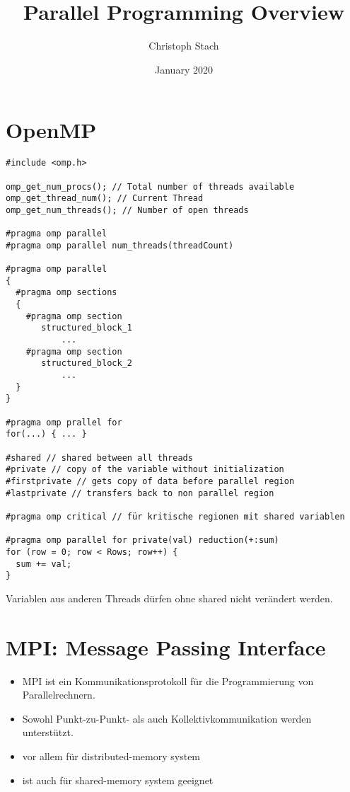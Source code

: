 \documentclass{article}
\title{Parallel Programming Overview}
\author{Christoph Stach}
\date{January 2020}
\begin{document}
\section{OpenMP}

\begin{listing}[H]
\begin{verbatim}
#include <omp.h>

omp_get_num_procs(); // Total number of threads available
omp_get_thread_num(); // Current Thread
omp_get_num_threads(); // Number of open threads

#pragma omp parallel
#pragma omp parallel num_threads(threadCount)

#pragma omp parallel
{
  #pragma omp sections
  {
    #pragma omp section
       structured_block_1
           ...
    #pragma omp section
       structured_block_2
           ...
  }
}

#pragma omp prallel for
for(...) { ... }

#shared // shared between all threads
#private // copy of the variable without initialization
#firstprivate // gets copy of data before parallel region
#lastprivate // transfers back to non parallel region

#pragma omp critical // für kritische regionen mit shared variablen

#pragma omp parallel for private(val) reduction(+:sum)
for (row = 0; row < Rows; row++) {
  sum += val;
}
\end{verbatim}
\end{listing}

\noindent Variablen aus anderen Threads dürfen ohne shared nicht verändert werden.

\section{MPI: Message Passing Interface}


\begin{itemize}
    \item MPI ist ein Kommunikationsprotokoll für die Programmierung von Parallelrechnern.
    \item Sowohl Punkt-zu-Punkt- als auch Kollektivkommunikation werden unterstützt.
    \item vor allem für distributed-memory system
    \item ist auch für shared-memory system geeignet
\end{itemize}
\end{document}
